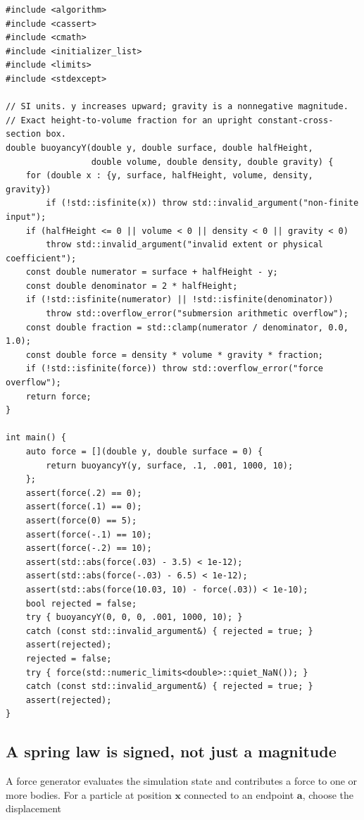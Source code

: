 \begin{verbatim}
#include <algorithm>
#include <cassert>
#include <cmath>
#include <initializer_list>
#include <limits>
#include <stdexcept>

// SI units. y increases upward; gravity is a nonnegative magnitude.
// Exact height-to-volume fraction for an upright constant-cross-section box.
double buoyancyY(double y, double surface, double halfHeight,
                 double volume, double density, double gravity) {
    for (double x : {y, surface, halfHeight, volume, density, gravity})
        if (!std::isfinite(x)) throw std::invalid_argument("non-finite input");
    if (halfHeight <= 0 || volume < 0 || density < 0 || gravity < 0)
        throw std::invalid_argument("invalid extent or physical coefficient");
    const double numerator = surface + halfHeight - y;
    const double denominator = 2 * halfHeight;
    if (!std::isfinite(numerator) || !std::isfinite(denominator))
        throw std::overflow_error("submersion arithmetic overflow");
    const double fraction = std::clamp(numerator / denominator, 0.0, 1.0);
    const double force = density * volume * gravity * fraction;
    if (!std::isfinite(force)) throw std::overflow_error("force overflow");
    return force;
}

int main() {
    auto force = [](double y, double surface = 0) {
        return buoyancyY(y, surface, .1, .001, 1000, 10);
    };
    assert(force(.2) == 0);
    assert(force(.1) == 0);
    assert(force(0) == 5);
    assert(force(-.1) == 10);
    assert(force(-.2) == 10);
    assert(std::abs(force(.03) - 3.5) < 1e-12);
    assert(std::abs(force(-.03) - 6.5) < 1e-12);
    assert(std::abs(force(10.03, 10) - force(.03)) < 1e-10);
    bool rejected = false;
    try { buoyancyY(0, 0, 0, .001, 1000, 10); }
    catch (const std::invalid_argument&) { rejected = true; }
    assert(rejected);
    rejected = false;
    try { force(std::numeric_limits<double>::quiet_NaN()); }
    catch (const std::invalid_argument&) { rejected = true; }
    assert(rejected);
}
\end{verbatim}

\subsection{A spring law is signed, not just a magnitude}\label{06-engine-ii-ch047-a-spring-law-is-signed-not-just-a-magnitude}

A force generator evaluates the simulation state and contributes a force to one or more bodies. For a particle at position \(\mathbf{x}\) connected to an endpoint \(\mathbf{a}\), choose the displacement

